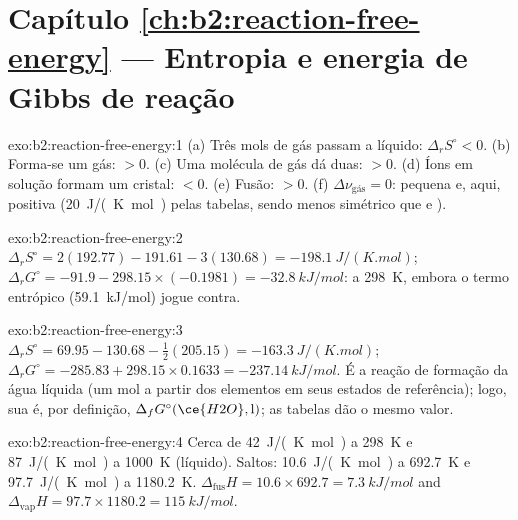 \section*{Capítulo \ref{ch:b2:reaction-free-energy} --- Entropia e energia de Gibbs de reação}

\begin{solution}{exo:b2:reaction-free-energy:1}
(a) Três mols de gás passam a líquido: $\Delta_r S^\circ < 0$. (b) Forma-se
um gás: $> 0$. (c) Uma molécula de gás dá duas: $> 0$. (d) Íons em solução
formam um cristal: $< 0$. (e) Fusão: $> 0$. (f) $\Delta\nu_{\text{gás}} = 0$:
pequena e, aqui, positiva (\qty{+20}{J/(K.mol)} pelas tabelas, sendo 
menos simétrico que  e ).
\end{solution}

\begin{solution}{exo:b2:reaction-free-energy:2}
$\Delta_r S^\circ = 2(192.77) - 191.61 - 3(130.68) = \qty{-198.1}{J/(K.mol)}$;
$\Delta_r G^\circ = -91.9 - 298.15 \times (-0.1981) = \qty{-32.8}{kJ/mol}$:
 a \qty{298}{K}, embora o termo entrópico (\qty{+59.1}{kJ/mol})
jogue contra.
\end{solution}

\begin{solution}{exo:b2:reaction-free-energy:3}
$\Delta_r S^\circ = 69.95 - 130.68 - \tfrac12(205.15) = \qty{-163.3}{J/(K.mol)}$;
$\Delta_r G^\circ = -285.83 + 298.15 \times 0.1633 = \qty{-237.14}{kJ/mol}$.
É a reação de formação da água líquida (um mol a partir dos elementos em
seus estados de referência); logo, sua  é,
por definição, $\Delta_f G^\circ(\ce{H2O}, \text{l})$; as tabelas dão o mesmo
valor.
\end{solution}

\begin{solution}{exo:b2:reaction-free-energy:4}
Cerca de \qty{42}{J/(K.mol)} a \qty{298}{K} e \qty{87}{J/(K.mol)} a
\qty{1000}{K} (líquido). Saltos: \qty{10.6}{J/(K.mol)} a \qty{692.7}{K} e
\qty{97.7}{J/(K.mol)} a \qty{1180.2}{K}. $\Delta_{\text{fus}}H = 10.6 \times
692.7 = \qty{7.3}{kJ/mol}$ and $\Delta_{\text{vap}}H = 97.7 \times 1180.2 =
\qty{115}{kJ/mol}$.
\end{solution}

